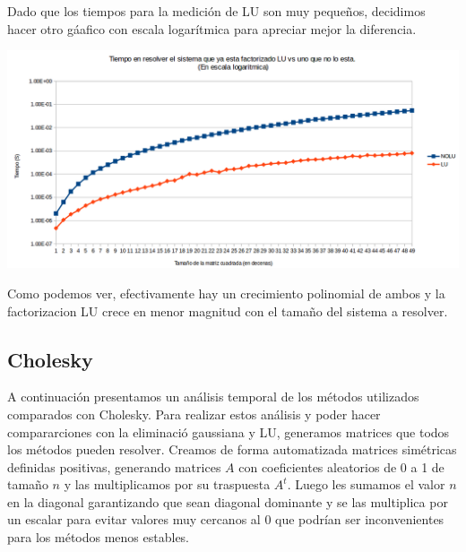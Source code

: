 Dado que los tiempos para la medición de LU son muy pequeños, decidimos hacer otro gáafico con escala logarítmica para apreciar mejor la diferencia.


{\centering
    \includegraphics[scale=0.6]{informe/imagenes/LUVSNOLUDIMLOG.PNG} \\
}

Como podemos ver, efectivamente hay un crecimiento polinomial de ambos y la factorizacion LU crece en menor magnitud con el tamaño del sistema a resolver.

\subsection{Cholesky}

A continuación presentamos un análisis temporal de los métodos utilizados comparados con Cholesky. Para realizar estos análisis y poder hacer compararciones con la eliminació gaussiana y LU, generamos matrices que todos los métodos pueden resolver. Creamos de forma automatizada matrices simétricas definidas positivas, generando matrices $A$ con coeficientes aleatorios de 0 a 1 de tamaño $n$ y las multiplicamos por su traspuesta $A^{t}$. Luego les sumamos el valor $n$ en la diagonal garantizando que sean diagonal dominante y se las multiplica por un escalar para evitar valores muy cercanos al 0 que podrían ser inconvenientes para los métodos menos estables. \\


